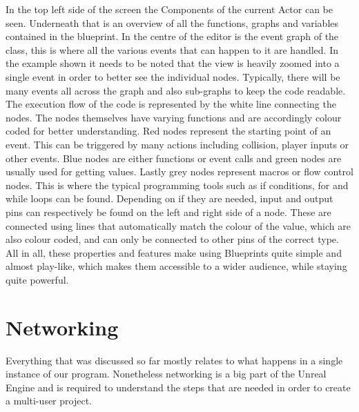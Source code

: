 In the top left side of the screen the Components of the current Actor can be seen. Underneath that is an overview of all the functions, graphs and variables contained in the blueprint. In the centre of the editor is the event graph of the class, this is where all the various events that can happen to it are handled. In the example shown it needs to be noted that the view is heavily zoomed into a single event in order to better see the individual nodes. Typically, there will be many events all across the graph and also sub-graphs to keep the code readable.\\
The execution flow of the code is represented by the white line connecting the nodes. The nodes themselves have varying functions and are accordingly colour coded for better understanding. Red nodes represent the starting point of an event. This can be triggered by many actions including collision, player inputs or other events. Blue nodes are either functions or event calls and green nodes are usually used for getting values. Lastly grey nodes represent macros or flow control nodes. This is where the typical programming tools such as if conditions, for and while loops can be found.
Depending on if they are needed, input and output pins can respectively be found on the left and right side of a node. These are connected using lines that automatically match the colour of the value, which are also colour coded, and can only be connected to other pins of the correct type.\\
All in all, these properties and features make using Blueprints quite simple and almost play-like, which makes them accessible to a wider audience, while staying quite powerful.

\section{Networking}

Everything that was discussed so far mostly relates to what happens in a single instance of our program. Nonetheless networking is a big part of the Unreal Engine and is required to understand the steps that are needed in order to create a multi-user project.\\

